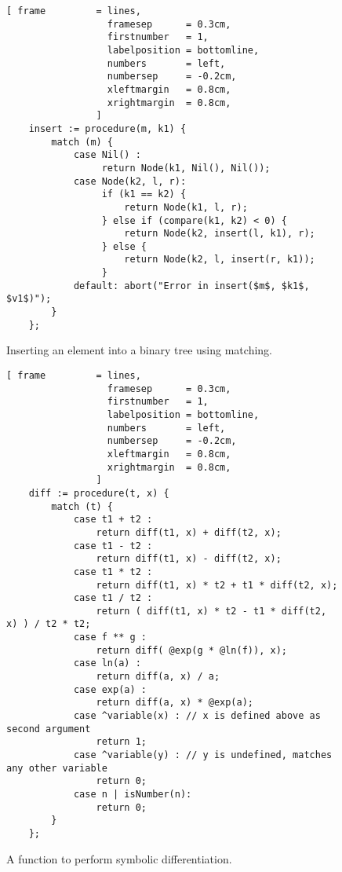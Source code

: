 \begin{figure}[!ht]
\centering
\begin{Verbatim}[ frame         = lines, 
                  framesep      = 0.3cm, 
                  firstnumber   = 1,
                  labelposition = bottomline,
                  numbers       = left,
                  numbersep     = -0.2cm,
                  xleftmargin   = 0.8cm,
                  xrightmargin  = 0.8cm,
                ]
    insert := procedure(m, k1) {
        match (m) {
            case Nil() : 
                 return Node(k1, Nil(), Nil());
            case Node(k2, l, r): 
                 if (k1 == k2) {
                     return Node(k1, l, r);
                 } else if (compare(k1, k2) < 0) { 
                     return Node(k2, insert(l, k1), r);
                 } else {
                     return Node(k2, l, insert(r, k1));
                 }
            default: abort("Error in insert($m$, $k1$, $v1$)");
        }
    };
\end{Verbatim}
\vspace*{-0.3cm}
\caption{Inserting an element into a binary tree using matching.}
\label{fig:binary-tree.stlx}
\end{figure}

\begin{figure}[!ht]
\centering
\begin{Verbatim}[ frame         = lines, 
                  framesep      = 0.3cm, 
                  firstnumber   = 1,
                  labelposition = bottomline,
                  numbers       = left,
                  numbersep     = -0.2cm,
                  xleftmargin   = 0.8cm,
                  xrightmargin  = 0.8cm,
                ]
    diff := procedure(t, x) {
        match (t) {
            case t1 + t2 :
                return diff(t1, x) + diff(t2, x);
            case t1 - t2 :
                return diff(t1, x) - diff(t2, x);
            case t1 * t2 :
                return diff(t1, x) * t2 + t1 * diff(t2, x);
            case t1 / t2 :
                return ( diff(t1, x) * t2 - t1 * diff(t2, x) ) / t2 * t2;
            case f ** g :
                return diff( @exp(g * @ln(f)), x);
            case ln(a) :
                return diff(a, x) / a;
            case exp(a) :
                return diff(a, x) * @exp(a);
            case ^variable(x) : // x is defined above as second argument
                return 1;
            case ^variable(y) : // y is undefined, matches any other variable
                return 0;
            case n | isNumber(n):   
                return 0;  
        }
    };
\end{Verbatim}
\vspace*{-0.3cm}
\caption{A function to perform symbolic differentiation.}
\label{fig:diff.stlx}
\end{figure}

